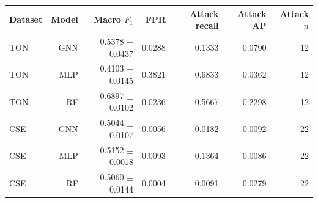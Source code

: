 \begin{tabular}{lrrrrrr}
\toprule
Dataset & Model & Macro $F_1$ & FPR & Attack recall & Attack AP & Attack $n$ \\
\midrule
TON & GNN & 0.5378 $\pm$ 0.0437 & 0.0288 & 0.1333 & 0.0790 & 12 \\
TON & MLP & 0.4103 $\pm$ 0.0145 & 0.3821 & 0.6833 & 0.0362 & 12 \\
TON & RF & 0.6897 $\pm$ 0.0102 & 0.0236 & 0.5667 & 0.2298 & 12 \\
CSE & GNN & 0.5044 $\pm$ 0.0107 & 0.0056 & 0.0182 & 0.0092 & 22 \\
CSE & MLP & 0.5152 $\pm$ 0.0018 & 0.0093 & 0.1364 & 0.0086 & 22 \\
CSE & RF & 0.5060 $\pm$ 0.0144 & 0.0004 & 0.0091 & 0.0279 & 22 \\
\bottomrule
\end{tabular}

